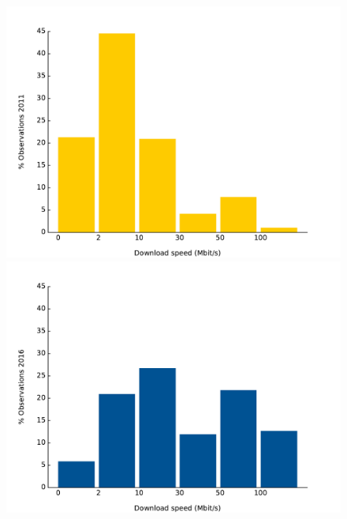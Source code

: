 \documentclass[12pt]{article}
\begin{document}
\vspace{1.2cm}
\begin{figure}[H]
   \begin{minipage}{0.5\textwidth}
        \centering
        \includegraphics[width=\textwidth]{histogram_dwld_2011.pdf}
    \end{minipage}\hfill
    \begin{minipage}{0.5\textwidth}
        \centering
        \includegraphics[width=\textwidth]{histogram_dwld_2016.pdf}
    \end{minipage}
    

\end{figure}
\end{document}
